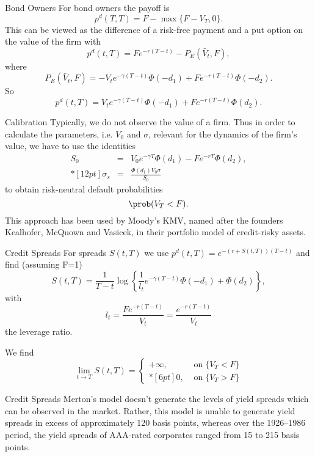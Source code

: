 Bond Owners
	For bond owners the payoff is
		$$
		p^d(T,T)=F-\max\{F-V_T,0\}.
		$$
	This can be viewed as the difference of a risk-free payment and a put option on the value of the firm with
		$$
		p^d(t,T)=Fe^{-r(T-t)}-P_E(\bar{V}_t,F),
		$$
	where
		$$
		P_E(\bar{V}_t,F)=-V_t e^{-\gamma(T-t)}
		\Phi(-d_1)+Fe^{-r(T-t)}\Phi(-d_2).
		$$
	So
		$$
		p^d(t,T)= V_t e^{-\gamma(T-t)} \Phi(-d_1)+
		Fe^{-r(T-t)}\Phi(d_2).
		$$


Calibration 
	Typically, we do not observe the value of a firm. Thus in order to
	calculate the parameters, i.e. $V_0$ and $\sigma$,  relevant for
	the dynamics of the firm's value, we have to use the identities
		\begin{eqnarray*}
		S_0 &=& V_0e^{-\gamma T}\Phi(d_1)-Fe^{-rT}\Phi(d_2),\\*[12pt] \sigma_s &=&
		\frac{\Phi(d_1)V_0\sigma}{S_0}
		\end{eqnarray*}
	to obtain risk-neutral default probabilities
		$$
		\prob(V_T<F).
		$$
	This approach has been used by Moody's KMV, named after
	the founders Kealhofer, McQuown and Vasicek, in their portfolio model of credit-risky assets.


Credit Spreads
	For spreads  $S(t,T)$ we use $p^d(t,T)=e^{-(r+S(t,T))(T-t)}$ and
	find (assuming F=1)
		$$
		S(t,T)=\frac{1}{T-t}\log\left\{\frac{1}{l_t}e^{-\gamma(T-t)}\Phi(-d_1)+\Phi(d_2)\right\},
		$$
	with
		$$
		l_t=\frac{F e^{-r(T-t)}}{V_t} = \frac{ e^{-r(T-t)}}{V_t}
		$$
	the leverage ratio.

	We find
		$$
		\lim_{t\rightarrow T} S(t,T)= \left\{\begin{array}{ll}
		+\infty, &\mbox{ on}\; \{V_T<F\}\\*[6pt]
		0, &\mbox{ on}\; \{V_T>F\}
		\end{array} \right.
		$$



Credit Spreads 
	Merton's model doesn't generate the levels of yield spreads which can be
	observed in the market. Rather, this model is unable to generate yield spreads 
	in excess of approximately 120 basis points, whereas over the 1926--1986 period, 
	the yield spreads of AAA-rated corporates ranged from 15 to 215 basis points.



